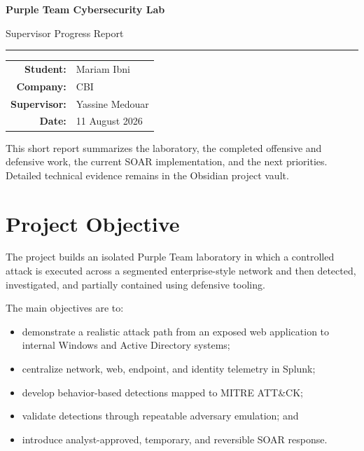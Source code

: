 \documentclass[11pt,a4paper]{article}
\begin{document}
\begin{titlepage}
  \centering
  \vspace*{2.5cm}
  {\Huge\bfseries Purple Team Cybersecurity Lab\par}
  \vspace{0.6cm}
  {\LARGE Supervisor Progress Report\par}
  \vspace{1.5cm}
  \rule{0.75\textwidth}{0.6pt}
  \vspace{1.2cm}

  \begin{tabular}{rl}
    \textbf{Student:} & Mariam Ibni \\
    \textbf{Company:} & CBI \\
    \textbf{Supervisor:} & Yassine Medouar \\
    \textbf{Date:} & 11 August 2026 \\
  \end{tabular}

  \vfill
  \colorbox{light}{%
    \parbox{0.82\textwidth}{%
      \centering
      This short report summarizes the laboratory, the completed offensive and
      defensive work, the current SOAR implementation, and the next priorities.
      Detailed technical evidence remains in the Obsidian project vault.
    }}
  \vfill
\end{titlepage}

\section{Project Objective}

The project builds an isolated Purple Team laboratory in which a controlled
attack is executed across a segmented enterprise-style network and then
detected, investigated, and partially contained using defensive tooling.

The main objectives are to:

\begin{itemize}
  \item demonstrate a realistic attack path from an exposed web application to
        internal Windows and Active Directory systems;
  \item centralize network, web, endpoint, and identity telemetry in Splunk;
  \item develop behavior-based detections mapped to MITRE ATT\&CK;
  \item validate detections through repeatable adversary emulation; and
  \item introduce analyst-approved, temporary, and reversible SOAR response.
\end{itemize}
\end{document}
